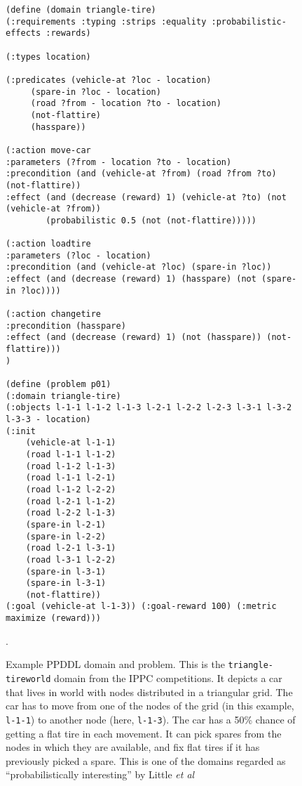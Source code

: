 \documentclass[../root.tex]{subfiles}
\begin{document}
\begin{figure}[tbhp]
\begin{lstlisting}
(define (domain triangle-tire)
(:requirements :typing :strips :equality :probabilistic-effects :rewards)

(:types location)

(:predicates (vehicle-at ?loc - location)
	 (spare-in ?loc - location)
	 (road ?from - location ?to - location)
	 (not-flattire)
	 (hasspare))

(:action move-car
:parameters (?from - location ?to - location)
:precondition (and (vehicle-at ?from) (road ?from ?to) (not-flattire))
:effect (and (decrease (reward) 1) (vehicle-at ?to) (not (vehicle-at ?from))
        (probabilistic 0.5 (not (not-flattire)))))

(:action loadtire
:parameters (?loc - location)
:precondition (and (vehicle-at ?loc) (spare-in ?loc))
:effect (and (decrease (reward) 1) (hasspare) (not (spare-in ?loc))))

(:action changetire
:precondition (hasspare)
:effect (and (decrease (reward) 1) (not (hasspare)) (not-flattire)))
)

(define (problem p01)
(:domain triangle-tire)
(:objects l-1-1 l-1-2 l-1-3 l-2-1 l-2-2 l-2-3 l-3-1 l-3-2 l-3-3 - location)
(:init
	(vehicle-at l-1-1)
	(road l-1-1 l-1-2)
	(road l-1-2 l-1-3)
	(road l-1-1 l-2-1)
	(road l-1-2 l-2-2)
	(road l-2-1 l-1-2)
	(road l-2-2 l-1-3)
	(spare-in l-2-1)
	(spare-in l-2-2)
	(road l-2-1 l-3-1)
	(road l-3-1 l-2-2)
	(spare-in l-3-1)
	(spare-in l-3-1)
	(not-flattire))
(:goal (vehicle-at l-1-3)) (:goal-reward 100) (:metric maximize (reward)))
\end{lstlisting}
	\caption{Example PPDDL domain and problem.
		This is the \texttt{triangle-tireworld} domain
		from the IPPC competitions. It depicts a car that
		lives in world with nodes distributed in a triangular grid.
		The car has to move from one of the nodes of the grid (in this example,
		\texttt{l-1-1}) to another node (here, \texttt{l-1-3}). The car has a
		50\% chance of getting a flat tire in each movement. It can pick spares
		from the nodes in which they are available, and fix flat tires if it
		has previously picked a spare. This is one of the domains regarded
		as ``probabilistically interesting'' by Little \emph{et al}~\cite{little2007probabilistic}}.
	\label{fig:pddl-triangle}
\end{figure}
\end{document}
